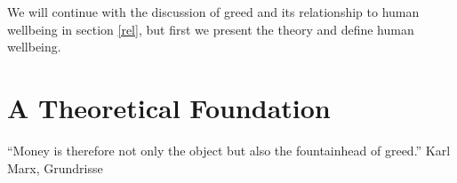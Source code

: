 \documentclass[10pt, letterpaper]{article}
\begin{document}
\begin{spacing}{1.8}
We will continue with the discussion of greed and its relationship to
human wellbeing in section \ref{rel}, but first we present the theory and define
human wellbeing.

\section{A Theoretical Foundation}

\noindent``Money is therefore not only the object but also the fountainhead of greed.'' Karl Marx, Grundrisse\\
 


%


\end{spacing}
\end{document}

